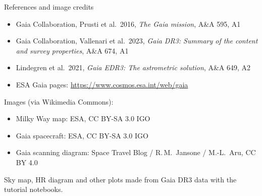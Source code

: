 \documentclass[aspectratio=169,11pt]{beamer}
\begin{document}
\begin{frame}{References and image credits}
\footnotesize
\begin{itemize}
\item Gaia Collaboration, Prusti et al.\ 2016, \textit{The Gaia mission}, A\&A 595, A1
\item Gaia Collaboration, Vallenari et al.\ 2023, \textit{Gaia DR3: Summary of the content and
      survey properties}, A\&A 674, A1
\item Lindegren et al.\ 2021, \textit{Gaia EDR3: The astrometric solution}, A\&A 649, A2
\item ESA Gaia pages: \url{https://www.cosmos.esa.int/web/gaia}
\end{itemize}
\vspace{0.5em}
Images (via Wikimedia Commons):
\begin{itemize}
\item Milky Way map: ESA, CC BY-SA 3.0 IGO
\item Gaia spacecraft: ESA, CC BY-SA 3.0 IGO
\item Gaia scanning diagram: Space Travel Blog / R.\,M.\ Jansone / M.-L.\ Aru, CC BY 4.0
\end{itemize}
\vspace{0.5em}
Sky map, HR diagram and other plots made from Gaia DR3 data with the tutorial notebooks.
\end{frame}
\end{document}
